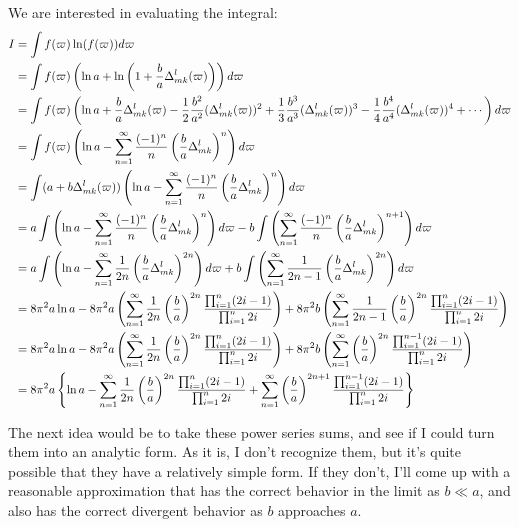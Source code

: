 \documentclass[letterpaper,twocolumn,amsmath,amssymb,pre]{revtex4-1}
\begin{document}
\begin{widetext}
We are interested in evaluating the integral:
\begin{align}
  I &= \int f(\mathbf{\varpi})\ln(f(\mathbf{\varpi})) d\mathbf{\varpi}
  \\
  &=
  \int f(\mathbf{\varpi})\left(\ln a
  + \ln\left(1 + \frac{b}{a}\Delta^{l}_{mk}(\mathbf{\varpi})\right)\right) d\mathbf{\varpi}
  \\
  &=
  \int f(\mathbf{\varpi})\left(\ln a
  + \frac{b}{a}\Delta^{l}_{mk}(\mathbf{\varpi})
  - \frac12 \frac{b^2}{a^2}(\Delta^{l}_{mk}(\mathbf{\varpi}))^2
  + \frac13 \frac{b^3}{a^3}(\Delta^{l}_{mk}(\mathbf{\varpi}))^3
  - \frac14 \frac{b^4}{a^4}(\Delta^{l}_{mk}(\mathbf{\varpi}))^4
  + \cdots\right) d\mathbf{\varpi} \\
  &=
  \int f(\mathbf{\varpi})\left(\ln a
  - \sum_{n=1}^{\infty} \frac{(-1)^{n}}{n} \left(\frac{b}{a}\Delta^{l}_{mk}\right)^n
  \right) d\mathbf{\varpi}
  \\
  &=
  \int (a + b \Delta^{l}_{mk}(\mathbf{\varpi}))\left(\ln a
  - \sum_{n=1}^{\infty} \frac{(-1)^{n}}{n} \left(\frac{b}{a}\Delta^{l}_{mk}\right)^n
  \right) d\mathbf{\varpi}
  \\
  &=
  a\int \left(\ln a
  - \sum_{n=1}^{\infty} \frac{(-1)^{n}}{n} \left(\frac{b}{a}\Delta^{l}_{mk}\right)^n
  \right) d\mathbf{\varpi}
  -
  b\int \left(\sum_{n=1}^{\infty} \frac{(-1)^{n}}{n} \left(\frac{b}{a}\Delta^{l}_{mk}\right)^{n+1}
  \right) d\mathbf{\varpi}
  \\
  &=
  a\int \left(\ln a
  - \sum_{n=1}^{\infty} \frac{1}{2n} \left(\frac{b}{a}\Delta^{l}_{mk}\right)^{2n}
  \right) d\mathbf{\varpi}
  +
  b\int \left(\sum_{n=1}^{\infty} \frac{1}{2n-1} \left(\frac{b}{a}\Delta^{l}_{mk}\right)^{2n}
  \right) d\mathbf{\varpi}
  \\
  &=
  8\pi^2 a \ln a
  - 8\pi^2a\left(
  \sum_{n=1}^{\infty} \frac{1}{2n} \left(\frac{b}{a}\right)^{2n}
   \frac{\prod_{i=1}^{n} (2i-1) }{ \prod_{i=1}^{n} 2i}
  \right)
  +
  8\pi^2 b \left(
   \sum_{n=1}^{\infty} \frac{1}{2n-1} \left(\frac{b}{a}\right)^{2n}
   \frac{\prod_{i=1}^{n} (2i-1) }{ \prod_{i=1}^{n} 2i}
  \right)
  \\
  &=
  8\pi^2 a \ln a
  - 8\pi^2a\left(
  \sum_{n=1}^{\infty} \frac{1}{2n} \left(\frac{b}{a}\right)^{2n}
   \frac{\prod_{i=1}^{n} (2i-1) }{ \prod_{i=1}^{n} 2i}
  \right)
  +
  8\pi^2 b \left(
   \sum_{n=1}^{\infty} \left(\frac{b}{a}\right)^{2n}
   \frac{\prod_{i=1}^{n-1} (2i-1) }{ \prod_{i=1}^{n} 2i}
  \right)
  \\
  &=
  8\pi^2 a \left\{
  \ln a
  -
  \sum_{n=1}^{\infty} \frac{1}{2n} \left(\frac{b}{a}\right)^{2n}
   \frac{\prod_{i=1}^{n} (2i-1) }{ \prod_{i=1}^{n} 2i}
  +
   \sum_{n=1}^{\infty} \left(\frac{b}{a}\right)^{2n+1}
   \frac{\prod_{i=1}^{n-1} (2i-1) }{ \prod_{i=1}^{n} 2i}
  \right\}
\end{align}
\end{widetext}
The next idea would be to take these power series sums, and see if I
could turn them into an analytic form.  As it is, I don't recognize
them, but it's quite possible that they have a relatively simple
form.  If they don't, I'll come up with a reasonable approximation
that has the correct behavior in the limit as $b \ll a$, and also has
the correct divergent behavior as $b$ approaches $a$.
\end{document}
